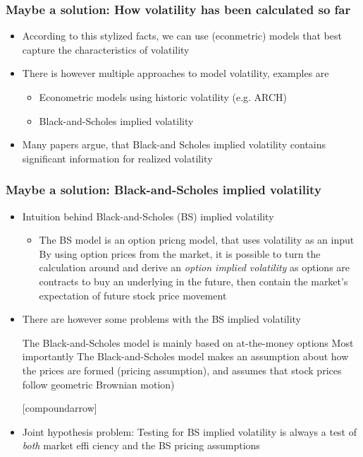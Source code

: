 \documentclass[aspectratio=169]{beamer}
\begin{document}
\begin{frame}
\frametitle{Maybe a solution: How volatility has been calculated so far}
	\begin{itemize}
	\item According to this stylized facts, we can use (econmetric) models that best capture the characteristics of volatility
	\item There is however multiple approaches to model volatility, examples are
		\begin{itemize}
		\item Econometric models using historic volatility (e.g. ARCH)
		\item Black-and-Scholes implied volatility
		\end{itemize}
	\item Many papers argue, that Black-and Scholes implied volatility contains significant information for realized volatility \parencite{jiang2005}
	\end{itemize}
\end{frame}

\begin{frame}
\frametitle{Maybe a solution: Black-and-Scholes implied volatility}
%
	\begin{itemize}
	\item Intuition behind Black-and-Scholes (BS) implied volatility
		\begin{itemize}
		\item The BS model is an option pricng model, that uses volatility as an input
		\pro By using option prices from the market, it is possible to turn the calculation around and derive an \textit{option implied volatility}
		\pro as options are contracts to buy an underlying in the future, then contain the market's expectation of future stock price movement 
		\end{itemize}
	\item There are however some problems with the BS implied volatility
		\begin{itemize}
		\con The Black-and-Scholes model is mainly based on at-the-money options 
		\con Most importantly The Black-and-Scholes model makes an assumption about how the prices are formed (pricing assumption), and assumes that stock prices follow geometric Brownian motion)
		\end{itemize}
[compoundarrow]
	\item Joint hypothesis problem: Testing for BS implied volatility is always a test of \textit{both} market effi	ciency and the BS pricing assumptions
	\end{itemize}
\end{frame}
\end{document}
